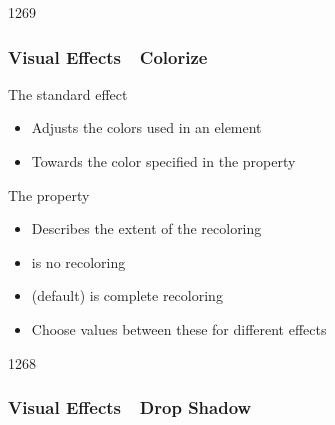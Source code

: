 \begin{slide}{1269}\frametitle{Visual Effects~\textendash~Colorize}

The standard  effect

\begin{itemize}
\item Adjusts the colors used in an element
\item Towards the color specified in the  property
\end{itemize}

\vspace*{0.5em}

\vspace*{1em}
The  property

\begin{itemize}
\item Describes the extent of the recoloring
\item {} is no recoloring
\item {} (default) is complete recoloring
\item Choose values between these for different effects
\end{itemize}

\end{slide}


\begin{slide}{1268}\frametitle{Visual Effects~\textendash~Drop Shadow}




\end{slide}


